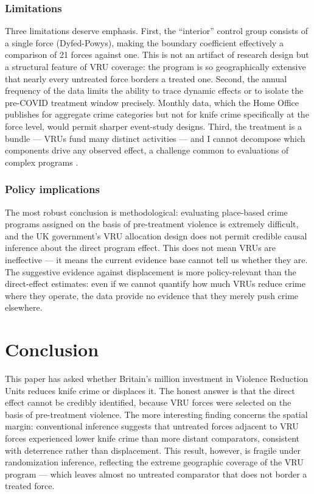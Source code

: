 \documentclass[12pt]{article}
\begin{document}
\subsubsection*{Limitations} Three limitations deserve emphasis. First, the ``interior'' control group consists of a single force (Dyfed-Powys), making the boundary coefficient effectively a comparison of 21 forces against one. This is not an artifact of research design but a structural feature of VRU coverage: the program is so geographically extensive that nearly every untreated force borders a treated one. Second, the annual frequency of the data limits the ability to trace dynamic effects or to isolate the pre-COVID treatment window precisely. Monthly data, which the Home Office publishes for aggregate crime categories but not for knife crime specifically at the force level, would permit sharper event-study designs. Third, the treatment is a bundle --- VRUs fund many distinct activities --- and I cannot decompose which components drive any observed effect, a challenge common to evaluations of complex programs \citep{ludwig2011mechanism}.

\subsubsection*{Policy implications} The most robust conclusion is methodological: evaluating place-based crime programs assigned on the basis of pre-treatment violence is extremely difficult, and the UK government's VRU allocation design does not permit credible causal inference about the direct program effect. This does not mean VRUs are ineffective --- it means the current evidence base cannot tell us whether they are. The suggestive evidence against displacement is more policy-relevant than the direct-effect estimates: even if we cannot quantify how much VRUs reduce crime where they operate, the data provide no evidence that they merely push crime elsewhere.


\section{Conclusion}
\label{sec:conclusion}

This paper has asked whether Britain's  million investment in Violence Reduction Units reduces knife crime or displaces it. The honest answer is that the direct effect cannot be credibly identified, because VRU forces were selected on the basis of pre-treatment violence. The more interesting finding concerns the spatial margin: conventional inference suggests that untreated forces adjacent to VRU forces experienced lower knife crime than more distant comparators, consistent with deterrence rather than displacement. This result, however, is fragile under randomization inference, reflecting the extreme geographic coverage of the VRU program --- which leaves almost no untreated comparator that does not border a treated force.
\end{document}
